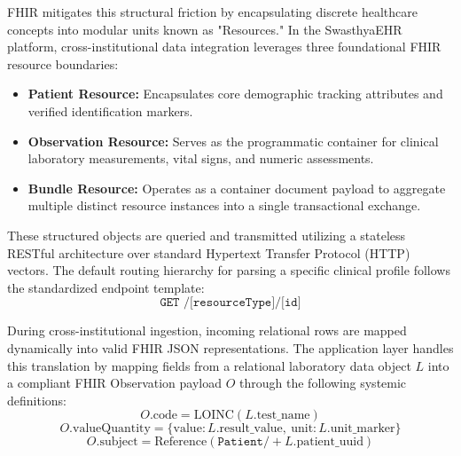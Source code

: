 \documentclass[12pt, a4paper]{report}
\numberwithin{equation}{chapter}
\begin{document}
FHIR mitigates this structural friction by encapsulating discrete healthcare concepts into modular units known as "Resources." In the SwasthyaEHR platform, cross-institutional data integration leverages three foundational FHIR resource boundaries:
\begin{itemize}
    \item \textbf{Patient Resource:} Encapsulates core demographic tracking attributes and verified identification markers.
    \item \textbf{Observation Resource:} Serves as the programmatic container for clinical laboratory measurements, vital signs, and numeric assessments.
    \item \textbf{Bundle Resource:} Operates as a container document payload to aggregate multiple distinct resource instances into a single transactional exchange.
\end{itemize}

These structured objects are queried and transmitted utilizing a stateless RESTful architecture over standard Hypertext Transfer Protocol (HTTP) vectors. The default routing hierarchy for parsing a specific clinical profile follows the standardized endpoint template:
\begin{equation}
    \texttt{GET\ /[resourceType]/[id]}
\end{equation}

During cross-institutional ingestion, incoming relational rows are mapped dynamically into valid FHIR JSON representations. The application layer handles this translation by mapping fields from a relational laboratory data object $L$ into a compliant FHIR Observation payload $O$ through the following systemic definitions:
\begin{equation}
    O\text{.code} = \text{LOINC}(L\text{.test\_name})
\end{equation}
\begin{equation}
    O\text{.valueQuantity} = \{ \text{value}: L\text{.result\_value},\ \text{unit}: L\text{.unit\_marker} \}
\end{equation}
\begin{equation}
    O\text{.subject} = \text{Reference}(\texttt{Patient/} + L\text{.patient\_uuid})
\end{equation}
\end{document}
